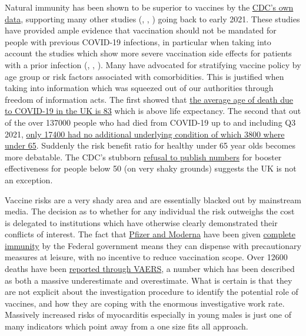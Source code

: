\documentclass[11pt,a4paper]{article}
\begin{document}
Natural immunity has been shown to be superior to vaccines by the \href{https://www.cdc.gov/mmwr/volumes/71/wr/mm7104e1.htm#F1_down}{CDC's own data}, supporting many other studies (\cite{Gazit2021.08.24.21262415}, \cite{doi:10.1126/science.abf4063}, \cite{Goldberg2021.04.20.21255670}) going back to early 2021. These studies have provided ample evidence that vaccination should not be mandated for people with previous COVID-19 infections, in particular when taking into account the studies which show more severe vaccination side effects for patients with a prior infection (\cite{Monforte2021}, \cite{LI20221082}, \cite{Raw22}). Many have advocated for stratifying vaccine policy by age group or risk factors associated with comorbidities. This is justified when taking into information which was squeezed out of our authorities through freedom of information acts. The first showed that \href{https://www.ons.gov.uk/aboutus/transparencyandgovernance/freedomofinformationfoi/averageageofthosewhohaddiedwithcovid19}{the average age of death due to COVID-19 in the UK is 83} which is above life expectancy. The second that out of the over 137000 people who had died from COVID-19 up to and including Q3 2021, \href{https://www.ons.gov.uk/aboutus/transparencyandgovernance/freedomofinformationfoi/deathsfromcovid19withnootherunderlyingcauses}{only 17400 had no additional underlying condition of which 3800 where under 65}. Suddenly the risk benefit ratio for healthy under 65 year olds becomes more debatable. The CDC's stubborn \href{https://www.dailymail.co.uk/news/article-10537161/CDC-refusing-publish-data-collected-booster-effectiveness-aged-18-49.html}{refusal to publish numbers} for booster effectiveness for people below 50 (on very shaky grounds) suggests the UK is not an exception. 

Vaccine risks are a very shady area and are essentially blacked out by mainstream media. The decision as to whether for any individual the risk outweighs the cost is delegated to institutions which have otherwise clearly demonstrated their conflicts of interest. The fact that \href{https://www.cnbc.com/2020/12/16/covid-vaccine-side-effects-compensation-lawsuit.html}{Pfizer and Moderna} have been given \href{https://crsreports.congress.gov/product/pdf/LSB/LSB10443}{complete immunity} by the Federal government means they can dispense with precautionary measures at leisure, with no incentive to reduce vaccination scope. Over 12600 deaths have been \href{https://www.cdc.gov/coronavirus/2019-ncov/vaccines/safety/adverse-events.html}{reported through VAERS}, a number which has been described as both a massive underestimate and overestimate. What is certain is that they are not explicit about the investigation procedure to identify the potential role of vaccines, and how they are coping with the enormous investigative work rate. Massively increased risks of myocarditis especially in young males \cite{10.1001/jama.2021.24110} is just one of many indicators which point away from a one size fits all approach.
\end{document}
